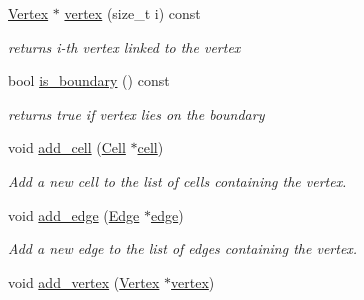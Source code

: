 \begin{DoxyCompactItemize}
\mbox{\label{classHArDCore2D_1_1Vertex_ae4d861f137a630bb3fde25acf03198ed}} 
\hyperlink{classHArDCore2D_1_1Vertex}{Vertex} $\ast$ \hyperlink{classHArDCore2D_1_1Vertex_ae4d861f137a630bb3fde25acf03198ed}{vertex} (size\+\_\+t i) const
\begin{DoxyCompactList}\small\item\em returns i-\/th vertex linked to the vertex \end{DoxyCompactList}\item 
bool \hyperlink{group__Mesh_gaea5f04b0b268e3de29d3de7d9034b4fc}{is\+\_\+boundary} () const
\begin{DoxyCompactList}\small\item\em returns true if vertex lies on the boundary \end{DoxyCompactList}\item 
\mbox{\label{classHArDCore2D_1_1Vertex_a133647cd83e7d3b92a9ac55fe5878808}} 
void \hyperlink{classHArDCore2D_1_1Vertex_a133647cd83e7d3b92a9ac55fe5878808}{add\+\_\+cell} (\hyperlink{classHArDCore2D_1_1Cell}{Cell} $\ast$\hyperlink{classHArDCore2D_1_1Vertex_a5054b903ff91506cc7d75afa44fd864b}{cell})
\begin{DoxyCompactList}\small\item\em Add a new cell to the list of cells containing the vertex. \end{DoxyCompactList}\item 
\mbox{\label{classHArDCore2D_1_1Vertex_abc7880abdf7299a56b38b1cb2302ed19}} 
void \hyperlink{classHArDCore2D_1_1Vertex_abc7880abdf7299a56b38b1cb2302ed19}{add\+\_\+edge} (\hyperlink{classHArDCore2D_1_1Edge}{Edge} $\ast$\hyperlink{classHArDCore2D_1_1Vertex_a782d7982e24169c50ea4631ffd3d9b55}{edge})
\begin{DoxyCompactList}\small\item\em Add a new edge to the list of edges containing the vertex. \end{DoxyCompactList}\item 
\mbox{\label{classHArDCore2D_1_1Vertex_aeffe35d0d60a1ee284f645a5642ff75c}} 
void \hyperlink{classHArDCore2D_1_1Vertex_aeffe35d0d60a1ee284f645a5642ff75c}{add\+\_\+vertex} (\hyperlink{classHArDCore2D_1_1Vertex}{Vertex} $\ast$\hyperlink{classHArDCore2D_1_1Vertex_ae4d861f137a630bb3fde25acf03198ed}{vertex})

\end{DoxyCompactItemize}
